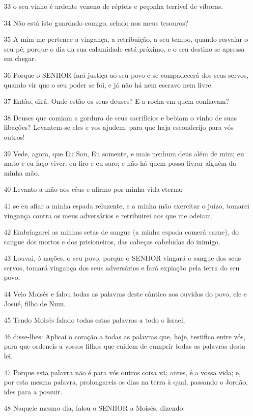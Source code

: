 \par 33 o seu vinho é ardente veneno de répteis e peçonha terrível de víboras.
\par 34 Não está isto guardado comigo, selado nos meus tesouros?
\par 35 A mim me pertence a vingança, a retribuição, a seu tempo, quando resvalar o seu pé; porque o dia da sua calamidade está próximo, e o seu destino se apressa em chegar.
\par 36 Porque o SENHOR fará justiça ao seu povo e se compadecerá dos seus servos, quando vir que o seu poder se foi, e já não há nem escravo nem livre.
\par 37 Então, dirá: Onde estão os seus deuses? E a rocha em quem confiavam?
\par 38 Deuses que comiam a gordura de seus sacrifícios e bebiam o vinho de suas libações? Levantem-se eles e vos ajudem, para que haja esconderijo para vós outros!
\par 39 Vede, agora, que Eu Sou, Eu somente, e mais nenhum deus além de mim; eu mato e eu faço viver; eu firo e eu saro; e não há quem possa livrar alguém da minha mão.
\par 40 Levanto a mão aos céus e afirmo por minha vida eterna:
\par 41 se eu afiar a minha espada reluzente, e a minha mão exercitar o juízo, tomarei vingança contra os meus adversários e retribuirei aos que me odeiam.
\par 42 Embriagarei as minhas setas de sangue (a minha espada comerá carne), do sangue dos mortos e dos prisioneiros, das cabeças cabeludas do inimigo.
\par 43 Louvai, ó nações, o seu povo, porque o SENHOR vingará o sangue dos seus servos, tomará vingança dos seus adversários e fará expiação pela terra do seu povo.
\par 44 Veio Moisés e falou todas as palavras deste cântico aos ouvidos do povo, ele e Josué, filho de Num.
\par 45 Tendo Moisés falado todas estas palavras a todo o Israel,
\par 46 disse-lhes: Aplicai o coração a todas as palavras que, hoje, testifico entre vós, para que ordeneis a vossos filhos que cuidem de cumprir todas as palavras desta lei.
\par 47 Porque esta palavra não é para vós outros coisa vã; antes, é a vossa vida; e, por esta mesma palavra, prolongareis os dias na terra à qual, passando o Jordão, ides para a possuir.
\par 48 Naquele mesmo dia, falou o SENHOR a Moisés, dizendo:
